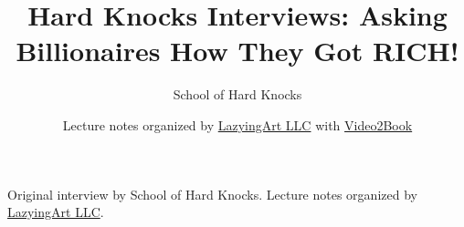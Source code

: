 \documentclass[11pt,oneside]{book}
\begin{document}
\frontmatter
\title{Hard Knocks Interviews: Asking Billionaires How They Got RICH!}
\author{School of Hard Knocks}
\date{Lecture notes organized by \href{https://lazying.art}{LazyingArt LLC} with \href{https://github.com/lachlanchen/Video2Book}{Video2Book}}
\maketitle
\begin{center}
\small Original interview by School of Hard Knocks. Lecture notes organized by \href{https://lazying.art}{LazyingArt LLC}.
\end{center}
\clearpage
\mainmatter

\end{document}
